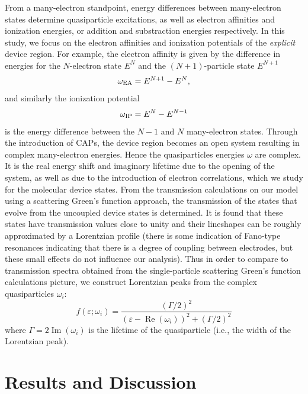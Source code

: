 From a many-electron standpoint, energy differences between
many-electron states determine quasiparticle excitations, as well as
electron affinities and ionization energies, or addition and substraction
energies respectively. In this study, we focus on the electron
affinities and ionization potentials of the {\it explicit} device
region. For example, the electron affinity is given by the
difference in energies for the $N$-electron state $E^N$ and the
$(N+1)$-particle state $E^{N+1}$
\begin{equation}
\omega_{\rm EA} = E^{N+1} -E^N,
\end{equation}
and similarly the ionization potential
\begin{equation}
\omega_{\rm IP} =  E^N - E^{N-1}
\end{equation}
is the energy difference between the $N-1$ and $N$ many-electron states.
Through the introduction of \acp{CAP}, the device region becomes an open
system resulting in complex many-electron energies. Hence the
quasiparticles energies $\omega$ are complex. It is the real energy
shift and imaginary lifetime due to the opening of the system, as well
as due to the introduction of electron correlations, which we study for
the molecular device states.
From the transmission calculations on our model using a scattering Green's
function approach, the transmission of the states that evolve from the
uncoupled device states is determined. It is found that these states have
transmission values close to unity and their lineshapes can be roughly
approximated by a Lorentzian profile (there is some indication of Fano-type
resonances indicating that there is a degree of coupling between 
electrodes, but these small effects do not influence our analysis). Thus in
order to compare to transmission spectra obtained from the
single-particle scattering Green's function calculations picture, we construct
Lorentzian peaks from the complex quasiparticles $\omega_i$:
\begin{equation}
        f(\varepsilon;\omega_i)
        = \frac{\left( \Gamma/2 \right)^2}
               {(\varepsilon - \operatorname{Re}(\omega_i))^2
               + \left( \Gamma/2 \right)^2}
        \label{eq:lobro}
\end{equation}
where $\Gamma = 2 \operatorname{Im}(\omega_i)$ is the lifetime of the
quasiparticle (i.e., the width of the Lorentzian peak).

\section{Results and Discussion}
\label{sec:results}

